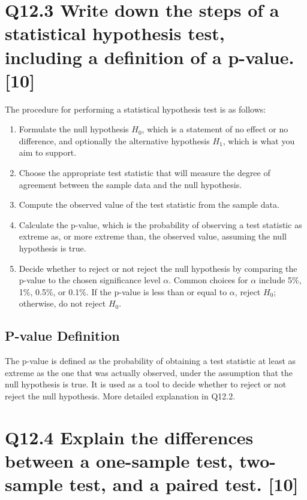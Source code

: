 \documentclass[11pt]{article}
\begin{document}
\section{Q12.3 Write down the steps of a statistical hypothesis test, including a definition of a p-value. [10]}

The procedure for performing a statistical hypothesis test is as follows:

\begin{enumerate}
    \item Formulate the null hypothesis \(H_0\), which is a statement of no effect or no difference, and optionally the alternative hypothesis \(H_1\), which is what you aim to support.
    \item Choose the appropriate test statistic that will measure the degree of agreement between the sample data and the null hypothesis.
    \item Compute the observed value of the test statistic from the sample data.
    \item Calculate the p-value, which is the probability of observing a test statistic as extreme as, or more extreme than, the observed value, assuming the null hypothesis is true.
    \item Decide whether to reject or not reject the null hypothesis by comparing the p-value to the chosen significance level \(\alpha\). Common choices for \(\alpha\) include 5\%, 1\%, 0.5\%, or 0.1\%. If the p-value is less than or equal to \(\alpha\), reject \(H_0\); otherwise, do not reject \(H_0\).
\end{enumerate}

\subsection*{P-value Definition}
The p-value is defined as the probability of obtaining a test statistic at least as extreme as the one that was actually observed, under the assumption that the null hypothesis is true. It is used as a tool to decide whether to reject or not reject the null hypothesis. More detailed explanation in Q12.2.

\section{Q12.4 Explain the differences between a one-sample test, two-sample test, and a paired test. [10]}
\end{document}
